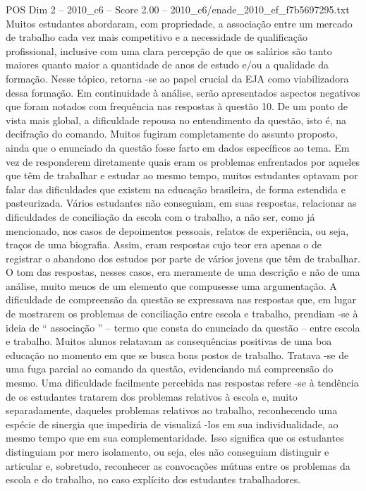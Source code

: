 \begin{textsample}{POS Dim 2 – 2010\_c6 – Score 2.00 – 2010\_c6/enade\_2010\_ef\_f7b5697295.txt}
Muitos estudantes abordaram, com propriedade, a associação entre um mercado de trabalho cada vez mais competitivo e a necessidade de qualificação profissional, inclusive com uma clara percepção de que os salários são tanto maiores quanto maior a quantidade de anos de estudo e/ou a qualidade da formação.
Nesse tópico, retorna -se ao papel crucial da EJA como viabilizadora dessa formação.
Em continuidade à análise, serão apresentados aspectos negativos que foram notados com frequência nas respostas à questão 10.
De um ponto de vista mais global, a dificuldade repousa no entendimento da questão, isto é, na decifração do comando.
Muitos fugiram completamente do assunto proposto, ainda que o enunciado da questão fosse farto em dados específicos ao tema.
Em vez de responderem diretamente quais eram os problemas enfrentados por aqueles que têm de trabalhar e estudar ao mesmo tempo, muitos estudantes optavam por falar das dificuldades que existem na educação brasileira, de forma estendida e pasteurizada.
Vários estudantes não conseguiam, em suas respostas, relacionar as dificuldades de conciliação da escola com o trabalho, a não ser, como já mencionado, nos casos de depoimentos pessoais, relatos de experiência, ou seja, traços de uma biografia.
Assim, eram respostas cujo teor era apenas o de registrar o abandono dos estudos por parte de vários jovens que têm de trabalhar.
O tom das respostas, nesses casos, era meramente de uma descrição e não de uma análise, muito menos de um elemento que compusesse uma argumentação.
A dificuldade de compreensão da questão se expressava nas respostas que, em lugar de mostrarem os problemas de conciliação entre escola e trabalho, prendiam -se à ideia de “ associação ” – termo que consta do enunciado da questão – entre escola e trabalho.
Muitos alunos relatavam as consequências positivas de uma boa educação no momento em que se busca bons postos de trabalho.
Tratava -se de uma fuga parcial ao comando da questão, evidenciando má compreensão do mesmo.
Uma dificuldade facilmente percebida nas respostas refere -se à tendência de os estudantes tratarem dos problemas relativos à escola e, muito separadamente, daqueles problemas relativos ao trabalho, reconhecendo uma espécie de sinergia que impediria de visualizá -los em sua individualidade, ao mesmo tempo que em sua complementaridade.
Isso significa que os estudantes distinguiam por mero isolamento, ou seja, eles não conseguiam distinguir e articular e, sobretudo, reconhecer as convocações mútuas entre os problemas da escola e do trabalho, no caso explícito dos estudantes trabalhadores.

\end{textsample}
